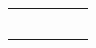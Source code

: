 \documentclass{article}
\begin{document}
\begin{center}
\begin{tabular}{|c|c|c|c|c|}
\hline
  &   &   &   &   \\ \hline
  &   &   &   &   \\ \hline
  &   &   &   &   \\ \hline
  &   &   &   &   \\ \hline
  &   &   &   &   \\ \hline
  &   &   &   &   \\ \hline
\end{tabular}
\end{center}
\end{document}
